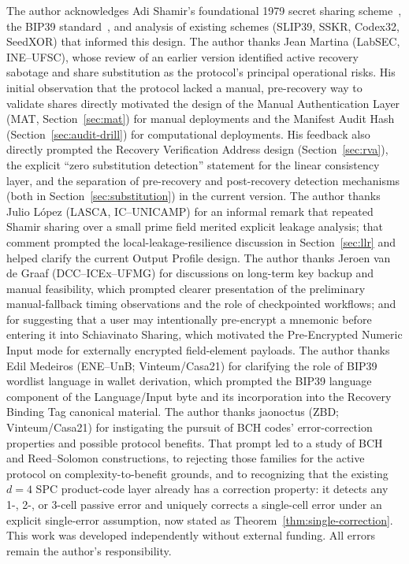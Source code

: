 \documentclass[11pt]{article}
\begin{document}
The author acknowledges Adi Shamir's foundational 1979 secret sharing scheme~\cite{shamir1979}, the BIP39 standard~\cite{bip39}, and analysis of existing schemes (SLIP39, SSKR, Codex32, SeedXOR) that informed this design. The author thanks Jean Martina (LabSEC, INE--UFSC), whose review of an earlier version identified active recovery sabotage and share substitution as the protocol's principal operational risks. His initial observation that the protocol lacked a manual, pre-recovery way to validate shares directly motivated the design of the Manual Authentication Layer (MAT, Section~\ref{sec:mat}) for manual deployments and the Manifest Audit Hash (Section~\ref{sec:audit-drill}) for computational deployments. His feedback also directly prompted the Recovery Verification Address design (Section~\ref{sec:rva}), the explicit ``zero substitution detection'' statement for the linear consistency layer, and the separation of pre-recovery and post-recovery detection mechanisms (both in Section~\ref{sec:substitution}) in the current version. The author thanks Julio L\'opez (LASCA, IC--UNICAMP) for an informal remark that repeated Shamir sharing over a small prime field merited explicit leakage analysis; that comment prompted the local-leakage-resilience discussion in Section~\ref{sec:llr} and helped clarify the current Output Profile design. The author thanks Jeroen van de Graaf (DCC--ICEx--UFMG) for discussions on long-term key backup and manual feasibility, which prompted clearer presentation of the preliminary manual-fallback timing observations and the role of checkpointed workflows; and for suggesting that a user may intentionally pre-encrypt a mnemonic before entering it into Schiavinato Sharing, which motivated the Pre-Encrypted Numeric Input mode for externally encrypted field-element payloads. The author thanks Edil Medeiros (ENE--UnB; Vinteum/Casa21) for clarifying the role of BIP39 wordlist language in wallet derivation, which prompted the BIP39 language component of the Language/Input byte and its incorporation into the Recovery Binding Tag canonical material. The author thanks jaonoctus (ZBD; Vinteum/Casa21) for instigating the pursuit of BCH codes' error-correction properties and possible protocol benefits. That prompt led to a study of BCH and Reed--Solomon constructions, to rejecting those families for the active protocol on complexity-to-benefit grounds, and to recognizing that the existing $d=4$ SPC product-code layer already has a correction property: it detects any 1-, 2-, or 3-cell passive error and uniquely corrects a single-cell error under an explicit single-error assumption, now stated as Theorem~\ref{thm:single-correction}. This work was developed independently without external funding. All errors remain the author's responsibility.
\end{document}

